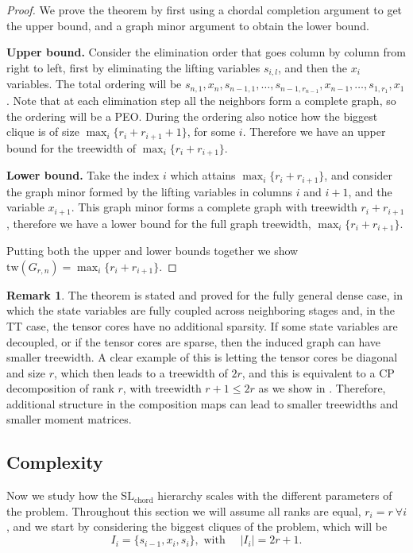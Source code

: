 \documentclass[11pt,a4paper]{article}
\theoremstyle{definition}
\newtheorem*{remark}{Remark}
\begin{document}
\begin{proof}
    We prove the theorem by first using a chordal completion argument to get the upper bound, and a graph minor argument to obtain the lower bound.

    \textbf{Upper bound.} Consider the elimination order that goes column by column from right to left, first by eliminating the lifting variables $s_{i,l}$, and then the $x_i$ variables. The total ordering will be $s_{n,1},x_n,s_{n-1,1},\dots,s_{n-1,r_{n-1}},x_{n-1},\dots,s_{1,r_1},x_1$. Note that at each elimination step all the neighbors form a complete graph, so the ordering will be a PEO. During the ordering also notice how the biggest clique is of size $\max_i \{r_i+r_{i+1}+1\}$, for some $i$. Therefore we have an upper bound for the treewidth of $\max_i \{r_i+r_{i+1}\}$.

    \textbf{Lower bound.} Take the index $i$ which attains $\max_i \{r_i+r_{i+1}\}$, and consider the graph minor formed by the lifting variables in columns $i$ and $i+1$, and the variable $x_{i+1}$. This graph minor forms a complete graph with treewidth $r_i+r_{i+1}$, therefore we have a lower bound for the full graph treewidth, $\max_i \{r_i+r_{i+1}\}$.

    Putting both the upper and lower bounds together we show $\mathrm{tw}(G_{r,n})=\max_i\{r_i+r_{i+1}\}$.
\end{proof}

\begin{remark}
    The theorem is stated and proved for the fully general dense case, in which the state variables are fully coupled across neighboring stages and, in the TT case, the tensor cores have no additional sparsity. If some state variables are decoupled, or if the tensor cores are sparse, then the induced graph can have smaller treewidth. A clear example of this is letting the tensor cores be diagonal and size $r$, which then leads to a treewidth of $2r$, and this is equivalent to a CP decomposition of rank $r$, with treewidth $r+1\leq2r$ as we show in \cite{LRPOP25}. Therefore, additional structure in the composition maps can lead to smaller treewidths and smaller moment matrices.
\end{remark}


\subsection{Complexity}

Now we study how the $\mathrm{SL}_{\mathrm{chord}}$ hierarchy scales with the different parameters of the problem. Throughout this section we will assume all ranks are equal, $r_i=r\ \forall i$, and we start by considering the biggest cliques of the problem, which will be 
\[
    I_i=\{s_{i-1},x_i,s_i\}, \text{ with }\quad |I_i|= 2r+1.
\]
\end{document}
